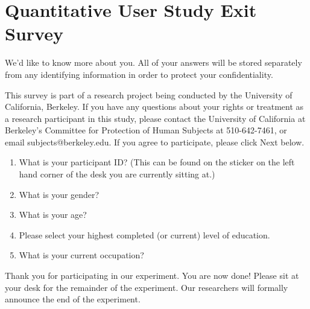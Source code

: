 \documentclass[USenglish,oneside,twocolumn]{article}
\begin{document}
\section{Quantitative User Study Exit Survey} 
\label{quantitative-exit-survey}
We'd like to know more about you.  All of your answers will be stored separately from any identifying information in order to protect your confidentiality.

This survey is part of a research project being conducted by the University of California, Berkeley. 
If you have any questions about your rights or treatment as a research participant in this study, please contact the University of California at Berkeley's 
Committee for Protection of Human Subjects at 510-642-7461, or email 
subjects@berkeley.edu. 
If you agree to participate, please click Next below.\\

\begin{enumerate}
\item{What is your participant ID? (This can be found on the sticker on the left hand corner of the desk you are currently sitting at.)}
\item{What is your gender?}
\item{What is your age?}
\item{Please select your highest completed (or current) level of education}.
\item{What is your current occupation?}  
\end{enumerate}

Thank you for participating in our experiment. You are now done! Please sit at your desk for the remainder of the experiment. Our researchers will formally announce the end of the experiment. 
\end{document}
